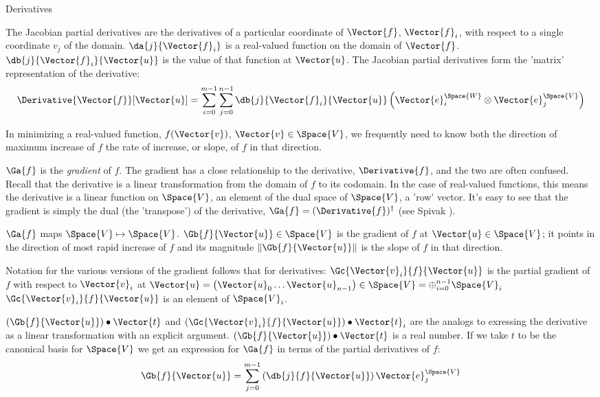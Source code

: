 \begin{plSection}{Derivatives}
\begin{itemize}
The Jacobian partial derivatives are the derivatives of
a particular coordinate of $\Vector{f}$, $\Vector{f}_i$, with respect to
a single coordinate $v_j$ of the domain.
$\da{j}{\Vector{f}_i}$ is a real-valued function on the domain of $\Vector{f}$.
$\db{j}{\Vector{f}_i}{\Vector{u}}$ is the value of that function at $\Vector{u}$.
The Jacobian partial derivatives form the 'matrix' representation of the derivative:
\begin{equation}
\Derivative{\Vector{f}}[\Vector{u}] =
\sum_{i=0}^{m-1}
\sum_{j=0}^{n-1}
\db{j}{\Vector{f}_i}{\Vector{u}} \left( \Vector{e}_i^{\Space{W}} \otimes \Vector{e}_j^{\Space{V}} \right)
\end{equation}

\end{itemize}

In minimizing a real-valued function, $f(\Vector{v})$, $\Vector{v} \in \Space{V}$,
we frequently need to know both the direction of maximum increase of $f$
the rate of increase, or slope, of $f$ in that direction.

$\Ga{f}$ is the \textit{gradient} of $f$.
The gradient has a close relationship to the derivative, $\Derivative{f}$,
and the two are often confused.
Recall that the derivative is a linear transformation
from the domain of $f$ to its codomain.
In the case of real-valued functions,
this means the derivative is a linear function on $\Space{V}$,
an element of the dual space of $\Space{V}$, a 'row' vector.
It's easy to see that the gradient is simply the dual (the 'transpose')
of the derivative, $\Ga{f} = (\Derivative{f})^{\dagger}$
(see Spivak \cite[p.~96, ex.~4-18]{Spivak:1965:CalculusOnManifolds}).

$\Ga{f}$ maps $\Space{V} \mapsto \Space{V}$.
$\Gb{f}{\Vector{u}} \in \Space{V}$ is the gradient of $f$ at $\Vector{u} \in \Space{V}$;
it points in the direction of most rapid increase of
$f$ and its magnitude $\| \Gb{f}{\Vector{u}} \|$ is the
slope of $f$ in that direction.

Notation for the various versions of the gradient
follows that for derivatives:
$\Gc{\Vector{v}_i}{f}{\Vector{u}}$ is the partial gradient of $f$ with respect to $\Vector{v}_i$ at
$\Vector{u} = \left( \Vector{u}_0 \ldots \Vector{u}_{n-1} \right) \in \Space{V} = \oplus_{i=0}^{n-1} \Space{V}_i$
$\Gc{\Vector{v}_i}{f}{\Vector{u}}$ is an element of $\Space{V}_i$.

$(\Gb{f}{\Vector{u}}) \bullet  \Vector{t}$
and
$(\Gc{\Vector{v}_i}{f}{\Vector{u}}) \bullet \Vector{t}_i$
are the analogs to exressing the derivative as a linear transformation
with an explicit argument.
$(\Gb{f}{\Vector{u}}) \bullet  \Vector{t}$ is a real number.
If we take $t$ to be the canonical basis for $\Space{V}$
we get an expression for $\Ga{f}$ in terms of the partial derivatives of $f$:
\begin{equation}
\label{eq:gradient-from-partials}
\Gb{f}{\Vector{u}} = \sum_{j=0}^{m-1} \left( \db{j}{f}{\Vector{u}} \right) \Vector{e}_j^{\Space{V}}
\end{equation}


\end{plSection}
